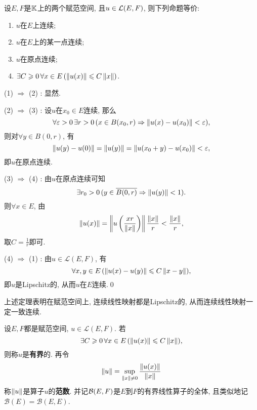     \begin{Theorem}[连续性]\label{thm:线性算子连续性}
    设$ E, F $是$ \mathbb{K} $上的两个赋范空间, 且$ u\in\mathcal{L}(E,F) $, 则下列命题等价:
    \begin{enumerate}[(1)]
    \item $ u $在$ E $上连续;
    \item $ u $在$ E $上的某一点连续;
    \item $ u $在原点连续;
    \item $ \exists C\geqslant 0\,\forall x\in E\,(\left\| u(x) \right\|\leqslant C\left\| x \right\|) $.
    \end{enumerate}
    \end{Theorem}
    \begin{Proof}
        (1) $ \Rightarrow $ (2) : 显然.
        
        (2) $ \Rightarrow $ (3) : 设$ u $在$ x_0\in E $连续, 那么
        \[
            \forall\varepsilon>0\,\exists r>0\,(x\in B(x_0,r)\Rightarrow\left\| u(x)-u(x_0) \right\|<\varepsilon),
        \]
        则对$ \forall y\in B(0,r) $, 有
        \[
            \left\| u(y)-u(0) \right\|=\left\| u(y) \right\|=\left\| u(x_0+y)-u(x_0) \right\|<\varepsilon,
        \]
        即$ u $在原点连续.
        
        (3) $ \Rightarrow $ (4) : 由$ u $在原点连续可知
        \[
            \exists r_0>0\,(y\in\overline{B(0,r)}\Rightarrow\left\| u(y) \right\|<1).
        \]
        则$ \forall x\in E $, 由
        \[
            \left\| u(x) \right\|=\left\| u\left(\dfrac{xr}{\left\| x \right\|}\right) \right\|\frac{\left\| x \right\|}{r}<\frac{\left\| x \right\|}{r},
        \]
        取$ C=\frac{1}{r} $即可.
        
        (4) $ \Rightarrow $ (1) : 由$ u\in\mathcal{L}(E,F) $, 有
        \[
            \forall x,y\in E\,(\left\| u(x)-u(y) \right\|\leqslant C\left\| x-y \right\|),
        \]
        即$ u $是Lipschitz的, 从而$ u $在$ E $连续.\qed
    \end{Proof}
    
    \begin{Remark}
        上述定理表明在赋范空间上, 连续线性映射都是Lipschitz的, 从而连续线性映射一定一致连续.
    \end{Remark}
    
    \begin{Definition}[算子范数]
        设$ E,F $都是赋范空间, $ u\in\mathcal{L}(E,F) $. 若
        \[
            \exists C\geqslant 0\,\forall x\in E\,(\left\| u(x) \right\|\leqslant C\left\| x \right\|),
        \]
        则称$ u $是\textbf{有界}的. 再令
        \[
            \left\| u \right\|=\sup_{\left\| x \right\|\ne 0}\frac{\left\| u(x) \right\|}{\left\| x \right\|}
        \]
        称$ \left\| u \right\| $是算子$ u $的\textbf{范数}. 并记$ \mathcal{B}(E,F) $是$ E $到$ F $的有界线性算子的全体, 且类似地记$ \mathcal{B}(E)=\mathcal{B}(E,E) $.
    \end{Definition}
    
